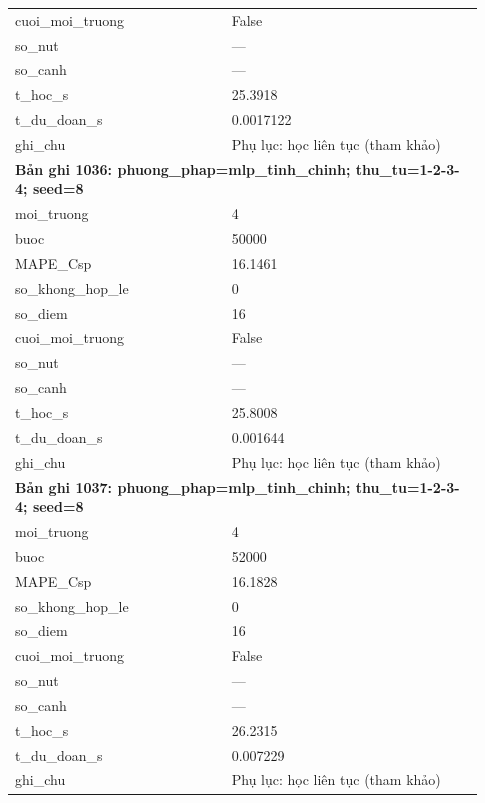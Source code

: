 \begin{longtable}{p{0.43\linewidth}p{0.50\linewidth}}
cuoi\_\allowbreak moi\_\allowbreak truong & False \\
so\_\allowbreak nut & — \\
so\_\allowbreak canh & — \\
t\_\allowbreak hoc\_\allowbreak s & 25.3918 \\
t\_\allowbreak du\_\allowbreak doan\_\allowbreak s & 0.0017122 \\
ghi\_\allowbreak chu & Phụ lục: học liên tục (tham khảo) \\
\midrule
\multicolumn{2}{p{0.95\linewidth}}{\textbf{Bản ghi 1036: phuong\_phap=mlp\_tinh\_chinh; thu\_tu=1-2-3-4; seed=8}} \\
moi\_\allowbreak truong & 4 \\
buoc & 50000 \\
MAPE\_\allowbreak Csp & 16.1461 \\
so\_\allowbreak khong\_\allowbreak hop\_\allowbreak le & 0 \\
so\_\allowbreak diem & 16 \\
cuoi\_\allowbreak moi\_\allowbreak truong & False \\
so\_\allowbreak nut & — \\
so\_\allowbreak canh & — \\
t\_\allowbreak hoc\_\allowbreak s & 25.8008 \\
t\_\allowbreak du\_\allowbreak doan\_\allowbreak s & 0.001644 \\
ghi\_\allowbreak chu & Phụ lục: học liên tục (tham khảo) \\
\midrule
\multicolumn{2}{p{0.95\linewidth}}{\textbf{Bản ghi 1037: phuong\_phap=mlp\_tinh\_chinh; thu\_tu=1-2-3-4; seed=8}} \\
moi\_\allowbreak truong & 4 \\
buoc & 52000 \\
MAPE\_\allowbreak Csp & 16.1828 \\
so\_\allowbreak khong\_\allowbreak hop\_\allowbreak le & 0 \\
so\_\allowbreak diem & 16 \\
cuoi\_\allowbreak moi\_\allowbreak truong & False \\
so\_\allowbreak nut & — \\
so\_\allowbreak canh & — \\
t\_\allowbreak hoc\_\allowbreak s & 26.2315 \\
t\_\allowbreak du\_\allowbreak doan\_\allowbreak s & 0.007229 \\
ghi\_\allowbreak chu & Phụ lục: học liên tục (tham khảo) \\

\end{longtable}
